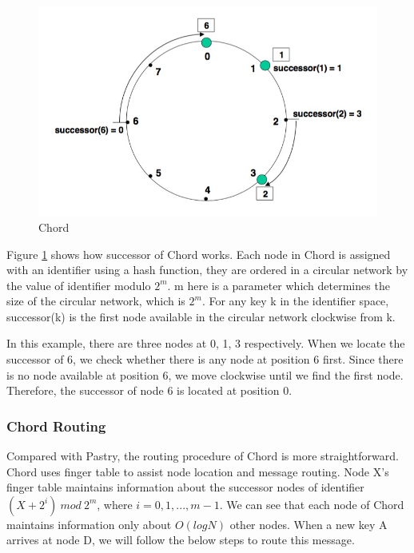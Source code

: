 \documentclass[11pt,a4paper]{article}
\begin{document}
    \begin{figure}[!htbp]
        \centering
        \includegraphics[scale=0.4]{image/chord.jpg}
        \caption{Chord}
        \label{fig:chord}
    \end{figure}
    
    Figure \ref{fig:chord} shows how successor of Chord works. Each node in Chord is assigned with an identifier using a hash function, they are ordered in a circular network by the value of identifier modulo \( 2^m \). m here is a parameter which determines the size of the circular network, which is \( 2^m \). For any key k in the identifier space, successor(k) is the first node available in the circular network clockwise from k.
    
    In this example, there are three nodes at 0, 1, 3 respectively. When we locate the successor of 6, we check whether there is any node at position 6 first. Since there is no node available at position 6, we move clockwise until we find the first node. Therefore, the successor of node 6 is located at position 0.
    
    \subsubsection{Chord Routing}
    
    Compared with Pastry, the routing procedure of Chord is more straightforward. Chord uses finger table to assist node location and message routing. Node X’s finger table maintains information about the successor nodes of identifier \( (X + 2^i )\ mod \ 2^m \), where \( i = 0, 1, ... , m-1 \). We can see that each node of Chord maintains information only about \( O(log N) \) other nodes. When a new key A arrives at node D, we will follow the below steps to route this message.
    
\end{document}
